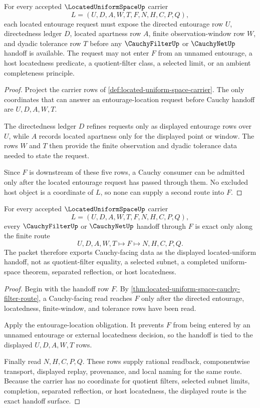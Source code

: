 \begin{theorem}\label{thm:located-uniform-space-entourage-location-obligation}
For every accepted $\LocatedUniformSpaceUp$ carrier
$$
L=(U,D,A,W,T,F,N,H,C,P,Q),
$$
each located entourage request must expose the directed entourage row $U$, directedness ledger $D$, located apartness row $A$, finite observation-window row $W$, and dyadic tolerance row $T$ before any $\CauchyFilterUp$ or $\CauchyNetUp$ handoff is available. The request may not enter $F$ from an unnamed entourage, a host locatedness predicate, a quotient-filter class, a selected limit, or an ambient completeness principle.
\end{theorem}
\begin{proof}
Project the carrier rows of \autoref{def:located-uniform-space-carrier}. The only coordinates that can answer an entourage-location request before Cauchy handoff are $U,D,A,W,T$.

The directedness ledger $D$ refines requests only as displayed entourage rows over $U$, while $A$ records located apartness only for the displayed point or window. The rows $W$ and $T$ then provide the finite observation and dyadic tolerance data needed to state the request.

Since $F$ is downstream of these five rows, a Cauchy consumer can be admitted only after the located entourage request has passed through them. No excluded host object is a coordinate of $L$, so none can supply a second route into $F$.
\end{proof}

\begin{theorem}\label{thm:located-uniform-space-filter-net-handoff-exactness}
For every accepted $\LocatedUniformSpaceUp$ carrier
$$
L=(U,D,A,W,T,F,N,H,C,P,Q),
$$
every $\CauchyFilterUp$ or $\CauchyNetUp$ handoff through $F$ is exact only along the finite route
$$
U,D,A,W,T \longmapsto F \longmapsto N,H,C,P,Q .
$$
The packet therefore exports Cauchy-facing data as the displayed located-uniform handoff, not as quotient-filter equality, a selected subnet, a completed uniform-space theorem, separated reflection, or host locatedness.
\end{theorem}
\begin{proof}
Begin with the handoff row $F$. By \autoref{thm:located-uniform-space-cauchy-filter-route}, a Cauchy-facing read reaches $F$ only after the directed entourage, locatedness, finite-window, and tolerance rows have been read.

Apply the entourage-location obligation. It prevents $F$ from being entered by an unnamed entourage or external locatedness decision, so the handoff is tied to the displayed $U,D,A,W,T$ rows.

Finally read $N,H,C,P,Q$. These rows supply rational readback, componentwise transport, displayed replay, provenance, and local naming for the same route. Because the carrier has no coordinate for quotient filters, selected subnet limits, completion, separated reflection, or host locatedness, the displayed route is the exact handoff surface.
\end{proof}

